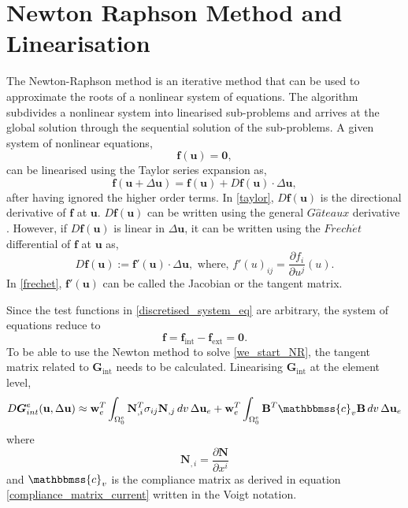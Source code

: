\section{Newton Raphson Method and Linearisation} \label{sec:newton_raphson_lin}
The Newton-Raphson method is an iterative method that can be used to approximate the roots of a nonlinear system of equations. 
 The algorithm subdivides a nonlinear system into linearised sub-problems and arrives at the global solution through the sequential
 solution of the sub-problems.
A given system of nonlinear equations, 
\begin{equation}
    \boldsymbol{f}(\boldsymbol{u}) = \boldsymbol{0},
\end{equation}
can be linearised using the Taylor series expansion as,
\begin{equation} \label{taylor}
    \boldsymbol{f}(\boldsymbol{u}+ \Delta \boldsymbol{u}) = \boldsymbol{f}(\boldsymbol{u}) + D \boldsymbol{f}(\boldsymbol{u}) \cdot \Delta \boldsymbol{u},
\end{equation}
after having ignored the higher order terms. In \eqref{taylor}, $D \boldsymbol{f}(\boldsymbol{u})$ is the directional derivative of
 $\boldsymbol{f}$ at $\boldsymbol{u}$. 
$D \boldsymbol{f}(\boldsymbol{u})$ can be written using the general $G\hat{a}teaux$ derivative \cite{sauer2016}. However, if $D \boldsymbol{f}(\boldsymbol{u})$ is linear
 in $\Delta \boldsymbol{u}$, it can be written using the $Frech\acute{e}t$ differential of $\boldsymbol{f}$ at $\boldsymbol{u}$ as,
 \begin{equation} \label{frechet}
    D \boldsymbol{f}(\boldsymbol{u}) := \boldsymbol{f'}\left(\boldsymbol{u}\right) \cdot \Delta \boldsymbol{u}, \text{ where, } f'(u)_{ij} = \frac{\partial f_{i}}{\partial u^{j}} (u).
 \end{equation}
In \eqref{frechet}, $\boldsymbol{f'}\left(\boldsymbol{u}\right)$ can be called the Jacobian or the tangent matrix. 

Since the test functions in \eqref{discretised_system_eq} are arbitrary, the system of equations reduce to 
\begin{equation} \label{we_start_NR}
    \mathbf{f} = \mathbf{f}_{\text{int}} - \mathbf{f}_{\text{ext}} = \boldsymbol{0}.
\end{equation}
To be able to use the Newton method to solve \eqref{we_start_NR}, the tangent matrix related to $\boldsymbol{G}_{\text{int}}$ needs to be calculated.
 Linearising $\boldsymbol{G}_{\text{int}}$ at the element level,
\begin{equation} \label{lin_Gint}
    D \boldsymbol{G}^{e}_{int} (\mathbf{u}, \Delta \mathbf{u}) \approx \mathbf{w}^{T}_{e} \int_{\Omega^{e}_{0}} \mathbf{N}^{T}_{,i} \sigma_{ij} \mathbf{N}_{,j} \,dv \,\Delta \mathbf{u}_{e}
        + \mathbf{w}^{T}_{e} \int_{\Omega^{e}_{0}} \mathbf{B}^{T} \mathbbmss{c}_{v} \mathbf{B} \,dv \,\Delta \mathbf{u}_{e}
\end{equation}
where 
\begin{equation}
    \mathbf{N}_{,i} = \frac{\partial \mathbf{N}}{\partial x^{i}}
\end{equation}
and $\mathbbmss{c}_{v}$ is the compliance matrix as derived in equation \eqref{compliance_matrix_current} written in the Voigt notation.

